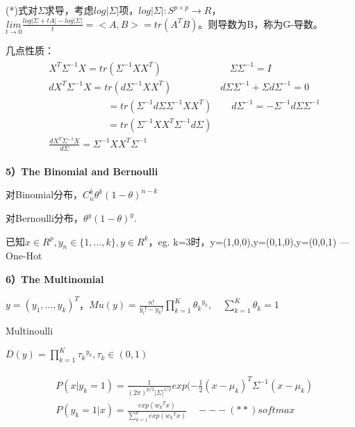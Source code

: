 \documentclass[12pt,UTF8,AutoFakeBold]{article}
\begin{document}
(*)式对$\Sigma$求导，考虑$log\left| \Sigma  \right| $项，$log\left| \Sigma  \right|: S^{p\times p}\rightarrow R $，$\underset { t\rightarrow 0 }{ lim } \frac { log\left| \Sigma +tA \right| -log\left| \Sigma  \right|  }{ t } =<A,B>=tr({ A }^{ T }B)$。则导数为B，称为G-导数。

几点性质：
\begin{gather}
\begin{aligned}
& { X }^{ T }{ \Sigma  }^{ -1 }X=tr({ \Sigma  }^{ -1 }X{ X }^{ T })\quad \quad \quad \quad \quad \quad \quad \Sigma { \Sigma  }^{ -1 }=I\\ 
& d{ X }^{ T }{ \Sigma  }^{ -1 }X=tr(d{ \Sigma  }^{ -1 }X{ X }^{ T })\quad \quad \quad \quad \quad d\Sigma { \Sigma  }^{ -1 }+\Sigma { d\Sigma  }^{ -1 }=0\\ 
&\quad \quad \quad \quad \quad \quad =tr({ \Sigma  }^{ -1 }d\Sigma { \Sigma  }^{ -1 }X{ X }^{ T })\quad \quad d{ \Sigma  }^{ -1 }=-{ \Sigma  }^{ -1 }d\Sigma { \Sigma  }^{ -1 }\\ 
& \quad \quad \quad \quad \quad \quad =tr({ \Sigma  }^{ -1 }X{ X }^{ T }{ \Sigma  }^{ -1 }d\Sigma )\\ 
& \frac { d{ X }^{ T }{ \Sigma  }^{ -1 }X }{ d\Sigma  } ={ \Sigma  }^{ -1 }X{ X }^{ T }{ \Sigma  }^{ -1 }
\end{aligned}
\end{gather}


\textbf{5）The Binomial and Bernoulli}

对Binomial分布，$C_n^k{\theta}^k{(1-\theta)}^{n-k}$

对Bernoulli分布，${ \theta  }^{ y }{ (1-\theta ) }^{ y }$.

已知$x\in { R }^{ p },{ y }_{ n }\in \{ 1,...,k\}, y\in R^k$，eg. k=3时，y=(1,0,0),y=(0,1,0),y=(0,0,1) ---One-Hot

\textbf{6）The Multinomial}

$y={ ({ y }_{ 1 }{ ,...,y }_{ k }) }^{ T }$，$Mu(y)=\frac { n! }{ { y }_{ i }!-{ y }_{ k }! } \prod _{ k=1 }^{ K }{ { { \theta  }_{ k } }^{ { y }_{ k } } } ,\quad \sum _{ k=1 }^{ K }{ { \theta  }_{ k }=1 } $

Multinoulli

$D(y)=\prod _{ k=1 }^{ K }{ { { \tau  }_{ k } }^{ { y }_{ k } } } ,{ \tau  }_{ k }\in (0,1)$

\begin{gather}
\begin{aligned}
& P(x|{ y }_{ k }=1)=\frac { 1 }{ { (2\pi ) }^{ p/2 }{ \left| \Sigma  \right|  }^{ 1/2 } } exp(-\frac { 1 }{ 2 } { (x-{ \mu  }_{ k }) }^{ T }{ \Sigma  }^{ -1 }(x-{ \mu  }_{ k })\\ 
& P({ y }_{ k }=1|x)=\frac { exp({ { w }_{ k } }^{ T }x) }{ \sum _{ k=1 }^{ p }{ exp({ { w }_{ k } }^{ T }x) }  } \quad ---(**)softmax
\end{aligned}
\end{gather}
\end{document}
